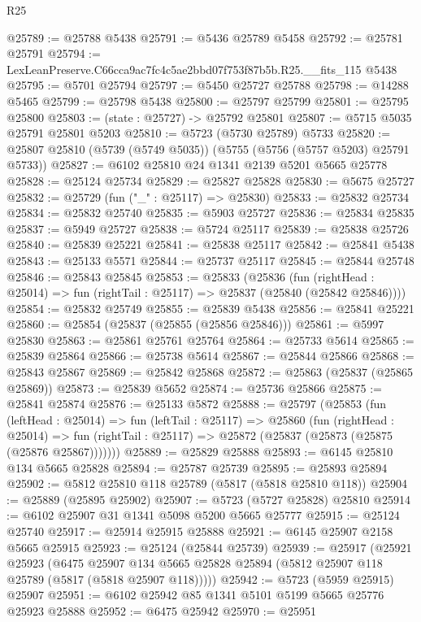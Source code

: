 \begin{lexlean}{R25}
\begin{coremodule}
@25789 := @25788 @5438
@25791 := @5436 @25789 @5458
@25792 := @25781 @25791
@25794 := LexLeanPreserve.C66cca9ac7fc4c5ae2bbd07f753f87b5b.R25.__fits_115 @5438
@25795 := @5701 @25794
@25797 := @5450 @25727 @25788
@25798 := @14288 @5465
@25799 := @25798 @5438
@25800 := @25797 @25799
@25801 := @25795 @25800
@25803 := (state : @25727) -> @25792 @25801
@25807 := @5715 @5035 @25791 @25801 @5203
@25810 := @5723 (@5730 @25789) @5733
@25820 := @25807 @25810 (@5739 (@5749 @5035)) (@5755 (@5756 (@5757 @5203) @25791 @5733))
@25827 := @6102 @25810 @24 @1341 @2139 @5201 @5665 @25778
@25828 := @25124 @25734
@25829 := @25827 @25828
@25830 := @5675 @25727
@25832 := @25729 (fun ("_" : @25117) => @25830)
@25833 := @25832 @25734
@25834 := @25832 @25740
@25835 := @5903 @25727
@25836 := @25834 @25835
@25837 := @5949 @25727
@25838 := @5724 @25117
@25839 := @25838 @25726
@25840 := @25839 @25221
@25841 := @25838 @25117
@25842 := @25841 @5438
@25843 := @25133 @5571
@25844 := @25737 @25117
@25845 := @25844 @25748
@25846 := @25843 @25845
@25853 := @25833
    (@25836
      (fun (rightHead : @25014) => fun (rightTail : @25117) => @25837 (@25840 (@25842 @25846))))
@25854 := @25832 @25749
@25855 := @25839 @5438
@25856 := @25841 @25221
@25860 := @25854 (@25837 (@25855 (@25856 @25846)))
@25861 := @5997 @25830
@25863 := @25861 @25761 @25764
@25864 := @25733 @5614
@25865 := @25839 @25864
@25866 := @25738 @5614
@25867 := @25844 @25866
@25868 := @25843 @25867
@25869 := @25842 @25868
@25872 := @25863 (@25837 (@25865 @25869))
@25873 := @25839 @5652
@25874 := @25736 @25866
@25875 := @25841 @25874
@25876 := @25133 @5872
@25888 := @25797
    (@25853
      (fun (leftHead : @25014) =>
      fun (leftTail : @25117) =>
      @25860
        (fun (rightHead : @25014) =>
        fun (rightTail : @25117) => @25872 (@25837 (@25873 (@25875 (@25876 @25867)))))))
@25889 := @25829 @25888
@25893 := @6145 @25810 @134 @5665 @25828
@25894 := @25787 @25739
@25895 := @25893 @25894
@25902 := @5812 @25810 @118 @25789 (@5817 (@5818 @25810 @118))
@25904 := @25889 (@25895 @25902)
@25907 := @5723 (@5727 @25828) @25810
@25914 := @6102 @25907 @31 @1341 @5098 @5200 @5665 @25777
@25915 := @25124 @25740
@25917 := @25914 @25915 @25888
@25921 := @6145 @25907 @2158 @5665 @25915
@25923 := @25124 (@25844 @25739)
@25939 := @25917
    (@25921
      @25923
      (@6475
        @25907
        @134
        @5665
        @25828
        @25894
        (@5812 @25907 @118 @25789 (@5817 (@5818 @25907 @118)))))
@25942 := @5723 (@5959 @25915) @25907
@25951 := @6102 @25942 @85 @1341 @5101 @5199 @5665 @25776 @25923 @25888
@25952 := @6475 @25942
@25970 := @25951

\end{coremodule}
\end{lexlean}
